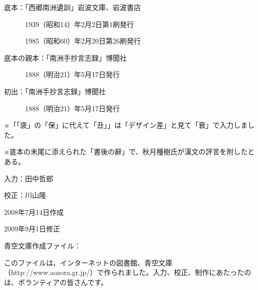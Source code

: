 \documentclass[tate,paper=b6j,jafontsize=9pt]{jlreq}
\begin{document}
\newpage
底本：「西郷南洲遺訓」岩波文庫、岩波書店

　　　1939（昭和14）年2月2日第1刷発行

　　　1985（昭和60）年2月20日第26刷発行

底本の親本：「南洲手抄言志録」博聞社

　　　1888（明治21）年5月17日発行

初出：「南洲手抄言志録」博聞社

　　　1888（明治21）年5月17日発行

※「「褒」の「保」に代えて「丑」」は「デザイン差」と見て「衰」で入力しました。

※底本の末尾に添えられた「書後の辭」で、秋月種樹氏が漢文の評言を附したとある。

入力：田中哲郎

校正：川山隆

2008年7月14日作成

2009年9月1日修正

青空文庫作成ファイル：

このファイルは、インターネットの図書館、青空文庫（http://www.aozora.gr.jp/）で作られました。入力、校正、制作にあたったのは、ボランティアの皆さんです。
\end{document}
